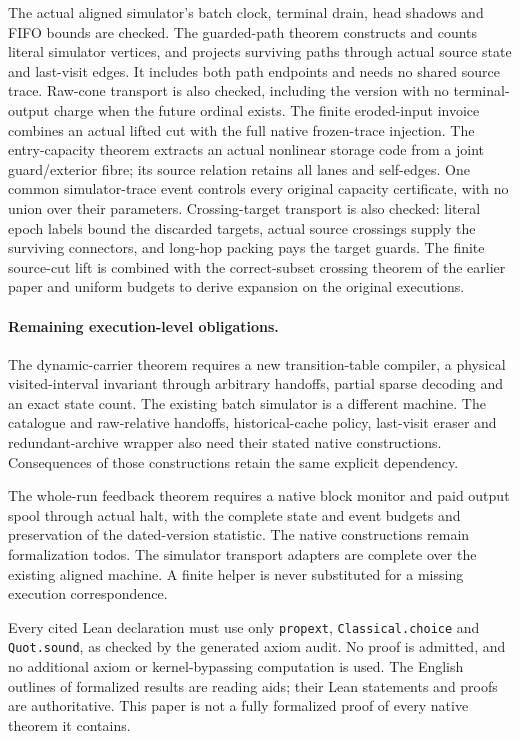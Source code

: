 The actual aligned simulator's batch clock, terminal drain, head shadows and
FIFO bounds are checked. The guarded-path theorem constructs and counts
literal simulator vertices, and projects surviving paths through actual source
state and last-visit edges. It includes both path endpoints and needs no
shared source trace. Raw-cone transport is also checked, including the
version with no terminal-output charge when the future ordinal exists.
The finite eroded-input invoice combines an actual lifted cut with the full
native frozen-trace injection. The entry-capacity theorem extracts an actual
nonlinear storage code from a joint guard/exterior fibre; its source relation
retains all lanes and self-edges. One common simulator-trace event controls
every original capacity certificate, with no union over their parameters.
Crossing-target transport is also checked: literal epoch labels bound the
discarded targets, actual source crossings supply the surviving connectors,
and long-hop packing pays the target guards. The finite source-cut lift is
combined with the correct-subset crossing theorem of the earlier paper and
uniform budgets to derive expansion on the original executions.

\paragraph{Remaining execution-level obligations.}
The dynamic-carrier theorem requires a new transition-table compiler, a
physical visited-interval invariant through arbitrary handoffs, partial
sparse decoding and an exact state count. The existing batch simulator is a
different machine. The catalogue and raw-relative handoffs, historical-cache
policy, last-visit eraser and redundant-archive wrapper also need their stated
native constructions. Consequences of those constructions retain the same
explicit dependency.

The whole-run feedback theorem requires a native
block monitor and paid output spool through actual halt, with the complete
state and event budgets and preservation of the dated-version statistic.
The native constructions remain formalization todos. The simulator transport
adapters are complete over the existing aligned machine. A finite helper is
never substituted for a missing execution
correspondence.

Every cited Lean declaration must use only \texttt{propext},
\texttt{Classical.choice} and \texttt{Quot.sound}, as checked by the generated
axiom audit. No proof is admitted, and no additional axiom or kernel-bypassing
computation is used. The English outlines of formalized results are reading
aids; their Lean statements and proofs are authoritative. This paper is not
a fully formalized proof of every native theorem it contains.
